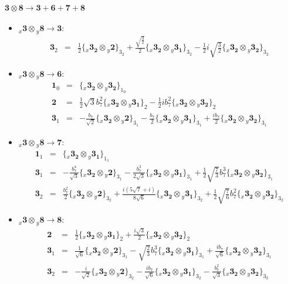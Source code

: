 \documentclass[english]{article}
\newcommand{\rep}[1]{\mathbf{#1}}
\newcommand{\repx}[2]{{}_{#2}\mathbf{#1}}
\newcommand{\subcg}[3]{\big\{ \repx{#1}{x}\otimes\repx{#2}{y}\big\}^{}_{#3}}
\begin{document}
\paragraph*{\Large $\rep{3}\otimes\rep{8}\to\rep{3}+\rep{6}+\rep{7}+\rep{8}$}
\begin{itemize}
\item $\repx{3}{x}\otimes\repx{8}{y}\to\rep{3}$:
\begin{eqnarray*}
\rep{3}_{2} &=& \frac{1}{2}\subcg{3_{2}}{2}{3_{2}}+\frac{\sqrt{\frac{3}{2}}}{2}\subcg{3_{2}}{3_{1}}{3_{2}}-\frac{1}{2} i \sqrt{\frac{3}{2}}\subcg{3_{2}}{3_{2}}{3_{2}}
\end{eqnarray*}
\item $\repx{3}{x}\otimes\repx{8}{y}\to\rep{6}$:
\begin{eqnarray*}
\rep{1}_{0} &=& \subcg{3_{2}}{3_{2}}{1_{0}}
\\
\rep{2} &=& \frac{1}{2} \sqrt{3} b_7^2\subcg{3_{2}}{3_{1}}{2}-\frac{1}{2} i b_7^2\subcg{3_{2}}{3_{2}}{2}
\\
\rep{3}_{1} &=& -\frac{b_7}{\sqrt{2}}\subcg{3_{2}}{2}{3_{1}}-\frac{b_7}{2}\subcg{3_{2}}{3_{1}}{3_{1}}+\frac{i b_7}{2}\subcg{3_{2}}{3_{2}}{3_{1}}
\end{eqnarray*}
\item $\repx{3}{x}\otimes\repx{8}{y}\to\rep{7}$:
\begin{eqnarray*}
\rep{1}_{1} &=& \subcg{3_{2}}{3_{1}}{1_{1}}
\\
\rep{3}_{1} &=& -\frac{b_7^4}{\sqrt{3}}\subcg{3_{2}}{2}{3_{1}}-\frac{b_7^3}{2 \sqrt{3}}\subcg{3_{2}}{3_{1}}{3_{1}}+\frac{1}{2} \sqrt{\frac{7}{3}} b_7^3\subcg{3_{2}}{3_{2}}{3_{1}}
\\
\rep{3}_{2} &=& \frac{b_7^2}{2}\subcg{3_{2}}{2}{3_{2}}+\frac{i \left(5 \sqrt{7}+i\right)}{8 \sqrt{6}}\subcg{3_{2}}{3_{1}}{3_{2}}+\frac{1}{2} \sqrt{\frac{7}{6}} b_7^2\subcg{3_{2}}{3_{2}}{3_{2}}
\end{eqnarray*}
\item $\repx{3}{x}\otimes\repx{8}{y}\to\rep{8}$:
\begin{eqnarray*}
\rep{2} &=& \frac{1}{2}\subcg{3_{2}}{3_{1}}{2}+\frac{i \sqrt{3}}{2}\subcg{3_{2}}{3_{2}}{2}
\\
\rep{3}_{1} &=& \frac{1}{\sqrt{6}}\subcg{3_{2}}{2}{3_{1}}-\sqrt{\frac{2}{3}} b_7^3\subcg{3_{2}}{3_{1}}{3_{1}}+\frac{i b_7}{\sqrt{6}}\subcg{3_{2}}{3_{2}}{3_{1}}
\\
\rep{3}_{2} &=& -\frac{i}{\sqrt{2}}\subcg{3_{2}}{2}{3_{2}}-\frac{i b_7}{\sqrt{6}}\subcg{3_{2}}{3_{1}}{3_{2}}-\frac{b_7^2}{\sqrt{3}}\subcg{3_{2}}{3_{2}}{3_{2}}
\end{eqnarray*}
\end{itemize}
\end{document}

